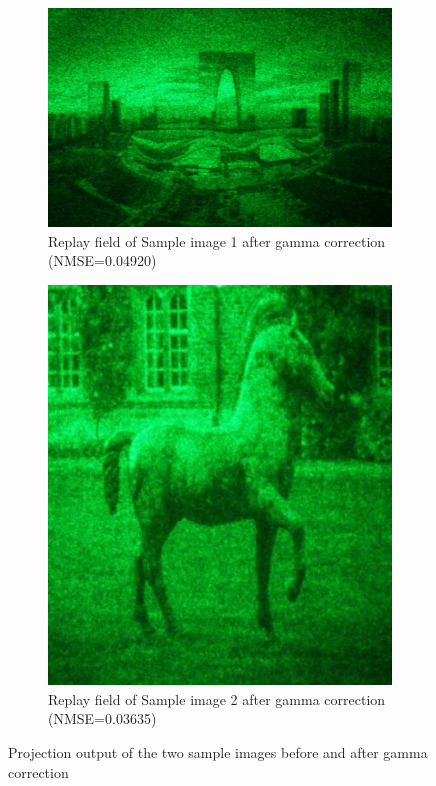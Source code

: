 \begin{figure}[H]
  \begin{subfigure}[t]{0.4\textwidth}
    \includegraphics[width=\textwidth]{szzx_gamma_corrected.jpg}
    \caption{Replay field of Sample image 1 after gamma correction (NMSE=0.04920)}\label{fig:szzx_gamma_corrected}
  \end{subfigure}
  \quad
  \begin{subfigure}[t]{0.219\textwidth}
    \includegraphics[width=\textwidth]{horse_gamma_corrected.jpg}
    \caption{Replay field of Sample image 2 after gamma correction (NMSE=0.03635)}\label{fig:horse_gamma_corrected}
  \end{subfigure}

  \caption{Projection output of the two sample images before and after gamma correction}
\end{figure}

